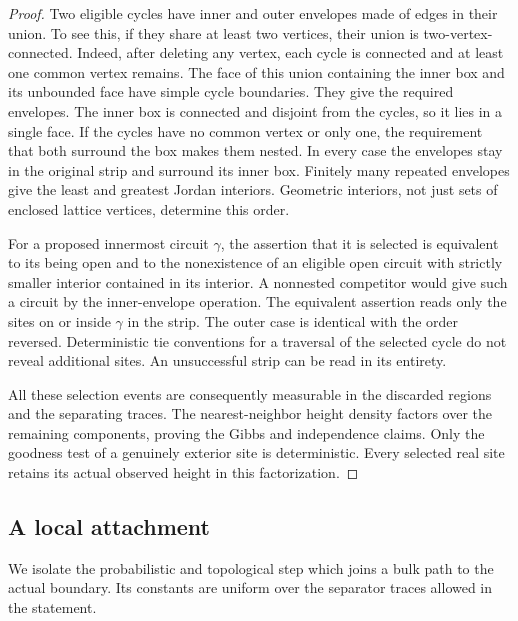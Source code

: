 \begin{proof}
Two eligible cycles have inner and outer envelopes made of edges in
their union.  To see this, if they share at least two vertices, their
union is two-vertex-connected.  Indeed, after deleting any vertex,
each cycle is connected and at least one common vertex remains.
The face of this union containing the inner box and its unbounded
face have simple cycle boundaries.  They give the required
envelopes.  The inner box is connected and disjoint from the cycles,
so it lies in a single face.  If the cycles have no common vertex or
only one, the requirement that both surround the box makes them
nested.  In every case the envelopes stay in the original strip
and surround its inner box.  Finitely many repeated envelopes give
the least and greatest Jordan interiors.  Geometric interiors, not
just sets of enclosed lattice vertices, determine this order.

For a proposed innermost circuit $\gamma$, the assertion that it is
selected is equivalent to its being open and to the nonexistence of
an eligible open circuit with strictly smaller interior contained
in its interior.  A nonnested competitor would give such a circuit
by the inner-envelope operation.  The equivalent assertion reads
only the sites on or inside $\gamma$ in the strip.  The outer case
is identical with the order reversed.  Deterministic tie conventions
for a traversal of the selected cycle do not reveal additional
sites.  An unsuccessful strip can be read in its entirety.

All these selection events are consequently measurable in the
discarded regions and the separating traces.  The nearest-neighbor
height density factors over the remaining components, proving the
Gibbs and independence claims.  Only the goodness test of a genuinely
exterior site is deterministic.  Every selected real site retains
its actual observed height in this factorization.
\end{proof}

\subsection{A local attachment}

We isolate the probabilistic and topological step which joins a bulk
path to the actual boundary.  Its constants are uniform over the
separator traces allowed in the statement.

